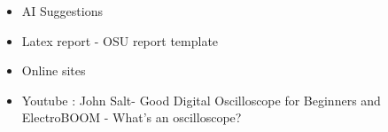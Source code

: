\begin{itemize}
    \item AI Suggestions
    \item Latex report - OSU report template
    \item Online sites
    \item Youtube : John Salt- Good Digital Oscilloscope for Beginners and ElectroBOOM - What's an oscilloscope?
\end{itemize}